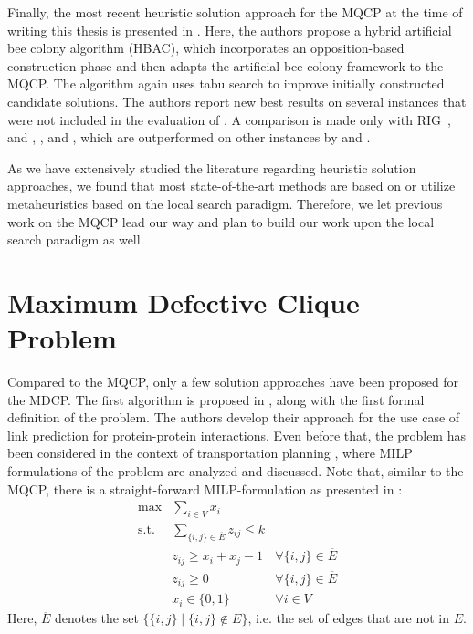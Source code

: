 \documentclass[draft,final]{vutinfth} %
\begin{document}
Finally, the most recent heuristic solution approach for the MQCP at the time of writing this thesis is presented in \cite{peng_solving_2021}. Here, the authors propose a hybrid artificial bee colony algorithm (HBAC), which incorporates an opposition-based construction phase and then adapts the artificial bee colony framework to the MQCP. The algorithm again uses tabu search to improve initially constructed candidate solutions. 
The authors report new best results on several instances that were not included in the evaluation of \cite{chen_nuqclq_2021}. A comparison is made only with RIG~\cite{oliveira2013construction}, and \cite{pinto2015biased}, \cite{pinto_biased_2018}, and \cite{pinto2021brkga}, which are outperformed on other instances by \cite{chen_nuqclq_2021} and \cite{zhou_opposition-based_2020}. 

As we have extensively studied the literature regarding heuristic solution approaches, we found that most state-of-the-art methods are based on or utilize metaheuristics based on the local search paradigm. Therefore, we let previous work on the MQCP lead our way and plan to build our work upon the local search paradigm as well. 

\section{Maximum Defective Clique Problem}\label{sec:mdcp-related-work}

Compared to the MQCP, only a few solution approaches have been proposed for the MDCP. 
The first algorithm is proposed in \cite{Yu2006}, along with the first formal definition of the problem. The authors develop their approach for the use case of link prediction for protein-protein interactions. Even before that, the problem has been considered in the context of transportation planning \cite{Sherali2002}, where MILP formulations of the problem are analyzed and discussed. 
Note that, similar to the MQCP, there is a straight-forward MILP-formulation as presented in \cite{Sherali2006}: 
\begin{align}
    \max & \sum_{i \in V} x_i &\\
    \text{s.t.} & \sum_{\{i,j\} \in \overline{E}} z_{ij} \leq k &\\
    & z_{ij} \geq x_i + x_j - 1 & \forall \{i,j\} \in \overline{E} \\
    & z_{ij} \geq 0 & \forall \{i,j\} \in \overline{E} \\
    & x_i \in \{0,1\} & \forall i \in V  
\end{align}
Here, $\overline{E}$ denotes the set $\{\{i,j\} \mid \{i,j\} \notin E\}$, i.e. the set of edges that are not in $E$. 
\end{document}
